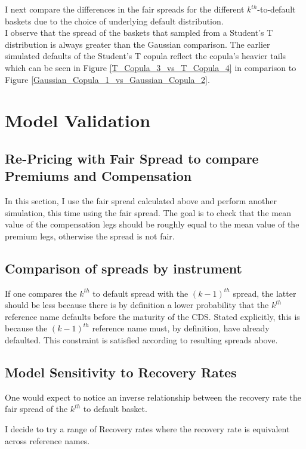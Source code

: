 \documentclass{report}
\theoremstyle{plain}
\theoremstyle{definition}
\begin{document}
I next compare the differences in the fair spreads for the different $k^{th}$-to-default baskets due to the choice of underlying default distribution.\\


I observe that the spread of the baskets that sampled from a Student's T distribution is always greater than the Gaussian comparison. The earlier simulated defaults of the Student's T copula reflect the copula's heavier tails which can be seen in Figure \ref{T_Copula_3_vs_T_Copula_4} in comparison to Figure \ref{Gaussian_Copula_1_vs_Gaussian_Copula_2}.


\chapter{Model Validation}

\section{Re-Pricing with Fair Spread to compare Premiums and Compensation}
In this section, I use the fair spread calculated above and perform another simulation, this time using the fair spread. The goal is to check that the mean value of the compensation legs should be roughly equal to the mean value of the premium legs, otherwise the spread is not fair.

\section{Comparison of spreads by instrument}
If one compares the $k^{th}$ to default spread with the $(k-1)^{th}$ spread, the latter should be less because there is by definition a lower probability that the $k^{th}$ reference name defaults before the maturity of the CDS. Stated explicitly, this is because the $(k-1)^{th}$ reference name must, by definition, have already defaulted. This constraint is satisfied according to resulting spreads above.

\section{Model Sensitivity to Recovery Rates}
One would expect to notice an inverse relationship between the recovery rate the fair spread of the $k^{th}$ to default basket. 

I decide to try a range of Recovery rates where the recovery rate is equivalent across reference names. \\
\end{document}
